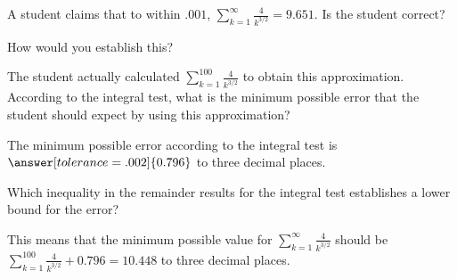 \documentclass{ximera}
\author{Jim Talamo}
\begin{document}
\begin{exercise}

A student claims that to within $.001$, $\sum_{k=1}^{\infty} \frac{4}{k^{3/2}} = 9.651$.  Is the student correct?

\begin{multipleChoice}
\end{multipleChoice}

How would you establish this?

\begin{multipleChoice}
\end{multipleChoice}

\begin{feedback}
The student actually calculated $\sum_{k=1}^{100} \frac{4}{k^{3/2}}$ to obtain this approximation.  According to the integral test, what is the minimum possible error that the student should expect by using this approximation?

The minimum possible error according to the integral test is $\answer[tolerance=.002]{0.796}$ to three decimal places.  
\end{feedback}

\begin{selectAll}
\end{selectAll}

\begin{hint}
Which inequality in the remainder results for the integral test establishes a lower bound for the error?
\end{hint}

\begin{feedback}
This means that the minimum possible value for $\sum_{k=1}^{\infty} \frac{4}{k^{3/2}}$ should be $\sum_{k=1}^{100} \frac{4}{k^{3/2}} +0.796 = 10.448$ to three decimal places.
\end{feedback}


\end{exercise}
\end{document}
